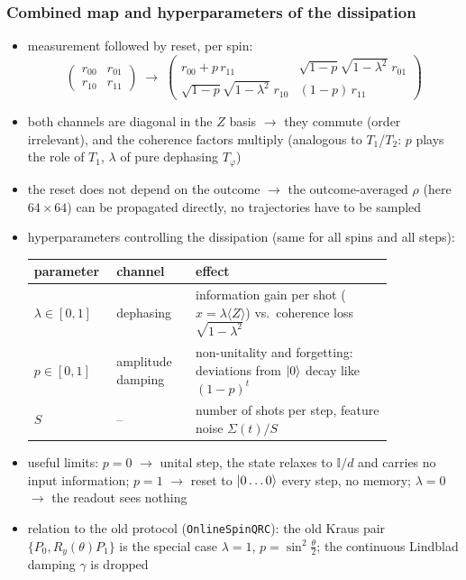 \subsubsection*{Combined map and hyperparameters of the dissipation}
\begin{itemize}
    \item measurement followed by reset, per spin:
    \begin{equation*}
        \begin{pmatrix} r_{00} & r_{01} \\ r_{10} & r_{11} \end{pmatrix} \;\to\;
        \begin{pmatrix} r_{00} + p\, r_{11} & \sqrt{1-p}\sqrt{1-\lambda^2}\; r_{01} \\
        \sqrt{1-p}\sqrt{1-\lambda^2}\; r_{10} & (1-p)\, r_{11} \end{pmatrix}
    \end{equation*}
    \item both channels are diagonal in the $Z$ basis $\to$ they commute (order irrelevant), and the
    coherence factors multiply (analogous to $T_1$/$T_2$: $p$ plays the role of $T_1$, $\lambda$ of pure
    dephasing $T_\varphi$)
    \item the reset does not depend on the outcome $\to$ the outcome-averaged $\rho$ (here $64\times 64$)
    can be propagated directly, no trajectories have to be sampled
    \item hyperparameters controlling the dissipation (same for all spins and all steps):
    \begin{center}
    \begin{tabular}{p{0.13\linewidth}p{0.2\linewidth}p{0.5\linewidth}}
        \hline
        parameter & channel & effect \\
        \hline
        $\lambda \in [0,1]$ & dephasing & information gain per shot ($x = \lambda\langle Z\rangle$) vs.\ coherence loss $\sqrt{1-\lambda^2}$ \\
        $p \in [0,1]$ & amplitude damping & non-unitality and forgetting: deviations from $\ket{0}$ decay like $(1-p)^t$ \\
        $S$ & -- & number of shots per step, feature noise $\Sigma(t)/S$ \\
        \hline
    \end{tabular}
    \end{center}
    \item useful limits: $p = 0$ $\to$ unital step, the state relaxes to $\mathbb{I}/d$ and carries no input
    information; $p = 1$ $\to$ reset to $\ket{0\ldots0}$ every step, no memory; $\lambda = 0$ $\to$ the
    readout sees nothing
    \item relation to the old protocol (\texttt{OnlineSpinQRC}): the old Kraus pair
    $\{P_0, R_y(\theta)P_1\}$ is the special case $\lambda = 1$, $p = \sin^2\frac{\theta}{2}$; the
    continuous Lindblad damping $\gamma$ is dropped
\end{itemize}

